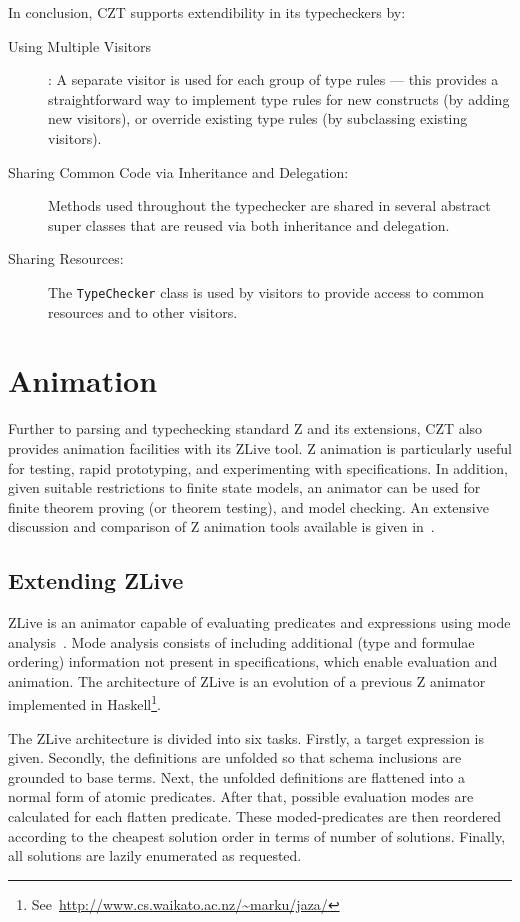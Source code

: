 \documentclass{llncs}
\begin{document}
In conclusion, CZT supports extendibility in its typecheckers by:
\begin{description}
 \item[Using Multiple Visitors]: A separate visitor is used for each
  group of type rules --- this provides a straightforward way to implement
  type rules for new constructs (by adding new visitors), or override
  existing type rules (by subclassing existing visitors).
 \item[Sharing Common Code via Inheritance and Delegation:]
   Methods used throughout the typechecker
   are shared in several abstract super classes that are reused
   via both inheritance and delegation.
 \item[Sharing Resources:] The {\tt TypeChecker} class is used by
   visitors to provide access to common resources and to other visitors.
\end{description}

\section{Animation}\label{animation}

    Further to parsing and typechecking standard Z and its extensions,
    CZT also provides animation facilities with its ZLive tool.  Z
    animation is particularly useful for testing, rapid prototyping,
    and experimenting with specifications.  In addition, given
    suitable restrictions to finite state models, an animator can be
    used for finite theorem proving (or theorem testing), and model
    checking.  An extensive discussion and comparison of Z animation
    tools available is given in~\cite{utting-jaza}.

\subsection{Extending ZLive}

    ZLive is an animator capable of evaluating predicates and
    expressions using mode analysis~\cite{winikooff98}.
    Mode analysis consists of including additional (type and formulae
    ordering) information not present in specifications, which enable
    evaluation and animation.
    The architecture of ZLive is an evolution of a previous Z animator
    implemented in
    Haskell\footnote{See~\url{http://www.cs.waikato.ac.nz/~marku/jaza/}}.

    The ZLive architecture is divided into six tasks.  Firstly, a
    target expression is given. Secondly, the definitions are unfolded
    so that schema inclusions are grounded to base terms. Next, the
    unfolded definitions are flattened into a normal form of atomic predicates.
    After that, possible evaluation modes are calculated for each flatten
    predicate.  These moded-predicates are then reordered according to the
    cheapest solution order in terms of number of solutions.  Finally,
    all solutions are lazily enumerated as requested.
\end{document}
